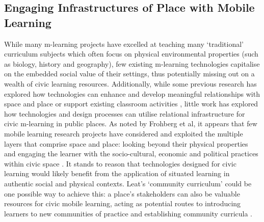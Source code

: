 \subsection{Engaging Infrastructures of Place with Mobile Learning}
While many m-learning projects have excelled at teaching many ‘traditional’ curriculum subjects which often focus on physical environmental properties (such as biology, history and geography), few existing m-learning technologies capitalise on the embedded social value of their settings, thus potentially missing out on a wealth of civic learning resources. Additionally, while some previous research has explored how technologies can enhance and develop meaningful relationships with space and place \citep{Giaccardi2008, Lentini2010} or support existing classroom activities \citep{Mann2016}, little work has explored how technologies and design processes can utilise relational infrastructure for civic m-learning in public places. As noted by Frohberg et al, it appears that few mobile learning research projects have considered and exploited the multiple layers that comprise space and place: looking beyond their physical properties and engaging the learner with the socio-cultural, economic and political practices within civic space \citep{Frohberg2009}. It stands to reason that technologies designed for civic learning would likely benefit from the application of situated learning in authentic social and physical contexts. Leat's `community curriculum' could be one possible way to achieve this: a place’s stakeholders can also be valuable resources for civic mobile learning, acting as potential routes to introducing learners to new communities of practice and establishing community curricula \citep{Leat2015}.

